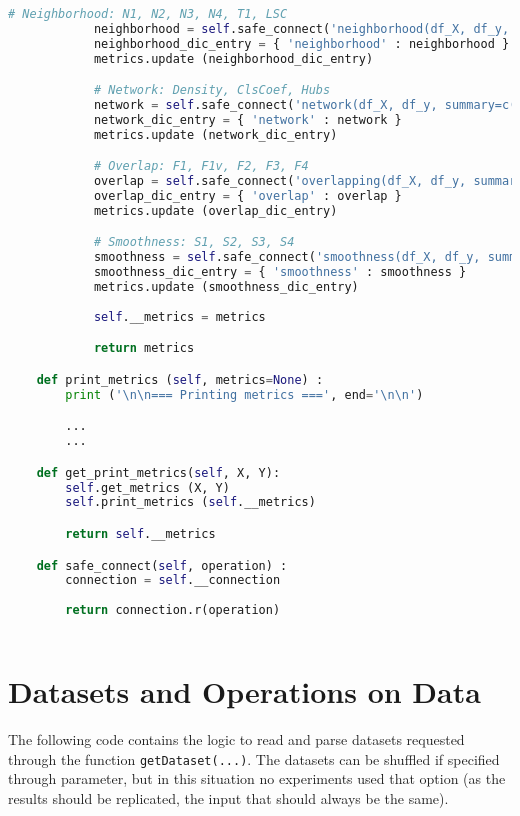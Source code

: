 \begin{lstlisting}[language=Python, caption={Connection code to requests R ECoL 
functions}, label={lst:r-connect}]
            # Neighborhood: N1, N2, N3, N4, T1, LSC
            neighborhood = self.safe_connect('neighborhood(df_X, df_y, summary=c("mean"))') 
            neighborhood_dic_entry = { 'neighborhood' : neighborhood }
            metrics.update (neighborhood_dic_entry)

            # Network: Density, ClsCoef, Hubs
            network = self.safe_connect('network(df_X, df_y, summary=c("mean"))') 
            network_dic_entry = { 'network' : network }
            metrics.update (network_dic_entry)

            # Overlap: F1, F1v, F2, F3, F4
            overlap = self.safe_connect('overlapping(df_X, df_y, summary=c("mean"))') 
            overlap_dic_entry = { 'overlap' : overlap }
            metrics.update (overlap_dic_entry)

            # Smoothness: S1, S2, S3, S4
            smoothness = self.safe_connect('smoothness(df_X, df_y, summary=c("mean"))') 
            smoothness_dic_entry = { 'smoothness' : smoothness }
            metrics.update (smoothness_dic_entry)
            
            self.__metrics = metrics

            return metrics

    def print_metrics (self, metrics=None) :
        print ('\n\n=== Printing metrics ===', end='\n\n')

        ...
        ...

    def get_print_metrics(self, X, Y):
        self.get_metrics (X, Y)
        self.print_metrics (self.__metrics)

        return self.__metrics

    def safe_connect(self, operation) :
        connection = self.__connection
        
        return connection.r(operation)
        
\end{lstlisting}

\section{Datasets and Operations on Data}

The following code contains the logic to read and parse datasets requested 
through the function \lstinline{getDataset(...)}. The datasets can be shuffled 
if specified through parameter, but in this situation no experiments used 
that option (as the results should be replicated, the input that should always
be the same).

